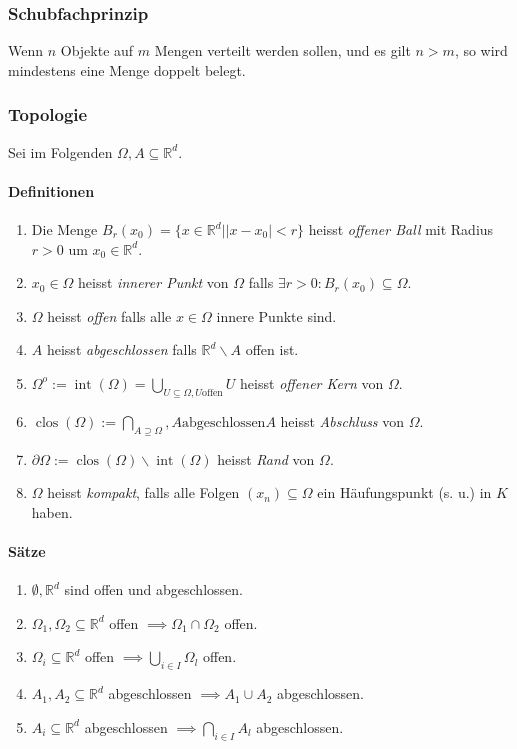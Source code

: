 \documentclass[a4paper, 9pt, DIV=24]{scrartcl}
\DeclareMathOperator{\clos}{clos}
\DeclareMathOperator{\Int}{int}
\newcommand{\R}{\mathbb{R}}
\begin{document}
\subsubsection{Schubfachprinzip}
Wenn $n$ Objekte auf $m$ Mengen verteilt werden sollen, und es gilt $n>m$, so wird mindestens eine Menge doppelt belegt.

\subsubsection{Topologie}
Sei im Folgenden $\Omega, A \subseteq \R^d$.
\paragraph{Definitionen}
\begin{enumerate}[label={(}\arabic*{)}]
 \item Die Menge $B_r(x_0) = \{x \in \R^d \left| |x-x_0| < r \right.\}$ heisst \emph{offener Ball} mit Radius $r > 0$ um $x_0 \in\R^d$.
 \item $x_0 \in \Omega$ heisst \emph{innerer Punkt} von $\Omega$ falls $\exists r > 0: B_r(x_0) \subseteq \Omega$.
 \item $\Omega$ heisst \emph{offen} falls alle $x \in \Omega$ innere Punkte sind.
 \item $A$ heisst \emph{abgeschlossen} falls $\R^d\backslash A$ offen ist.
 \item $\Omega^{o} := \Int(\Omega) = \bigcup_{U\subseteq\Omega,U \text{offen}} U$ heisst \emph{offener Kern} von $\Omega$.
 \item $\clos(\Omega) := \bigcap_{A\supseteq \Omega}, A \text{abgeschlossen} A$ heisst \emph{Abschluss} von $\Omega$.
 \item $\partial\Omega := \clos(\Omega)\backslash\Int(\Omega)$ heisst \emph{Rand} von $\Omega$.
 \item $\Omega$ heisst \emph{kompakt}, falls alle Folgen $(x_n) \subseteq \Omega$ ein Häufungs\-punkt (s. u.) in $K$ haben.
\end{enumerate}

\paragraph{Sätze}
\begin{enumerate}[label={(}\arabic*{)}]
 \item $\emptyset, \R^d$ sind offen und abgeschlossen.
 \item $\Omega_1, \Omega_2 \subseteq \R^d$ offen $\implies \Omega_1 \cap \Omega_2$ offen.
 \item $\Omega_i \subseteq \R^d$ offen $\implies \bigcup_{i\in I} \Omega_l$ offen.
 \item $A_1, A_2 \subseteq \R^d$ abgeschlossen $\implies A_1 \cup A_2$ abgeschlossen.
 \item $A_i \subseteq \R^d$ abgeschlossen $\implies \bigcap_{i\in I} A_l$ abgeschlossen.
\end{enumerate}
\end{document}

